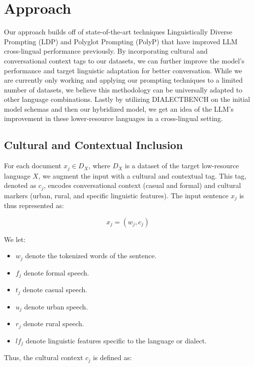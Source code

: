 \section{Approach}
\label{sec:approach}

Our approach builds off of state-of-the-art techniques Linguistically Diverse Prompting (LDP) \cite{Nguyen:24} and Polyglot Prompting (PolyP) \cite{Ng:22} that have improved LLM cross-lingual performance previously. By incorporating cultural and conversational context tags to our datasets, we can further improve the model's performance and target linguistic adaptation for better conversation. While we are currently only working and applying our prompting techniques to a limited number of datasets, we believe this methodology can be universally adapted to other language combinations. Lastly by utilizing DIALECTBENCH \cite{Faisal:24} on the initial model schemas and then our hybridized model, we get an idea of the LLM's improvement in these lower-resource languages in a cross-lingual setting.

\subsection{Cultural and Contextual Inclusion}

For each document \(x_j \in D_X\), where \(D_X\) is a dataset of the target low-resource language \(X\), we augment the input with a cultural and contextual tag. This tag, denoted as \(c_j\), encodes conversational context (casual and formal) and cultural markers (urban, rural, and specific linguistic features). The input sentence \(x_j\) is thus represented as:

\[
x_j = (w_j, c_j)
\]

\noindent We let:

\begin{itemize}
    \item \(w_j\) denote the tokenized words of the sentence.
    \item \(f_j\) denote formal speech.
    \item \(t_j\) denote casual speech.
    \item \(u_j\) denote urban speech.
    \item \(r_j\) denote rural speech.
    \item \(lf_j\) denote linguistic features specific to the language or dialect.
\end{itemize}

Thus, the cultural context \(c_j\) is defined as:

